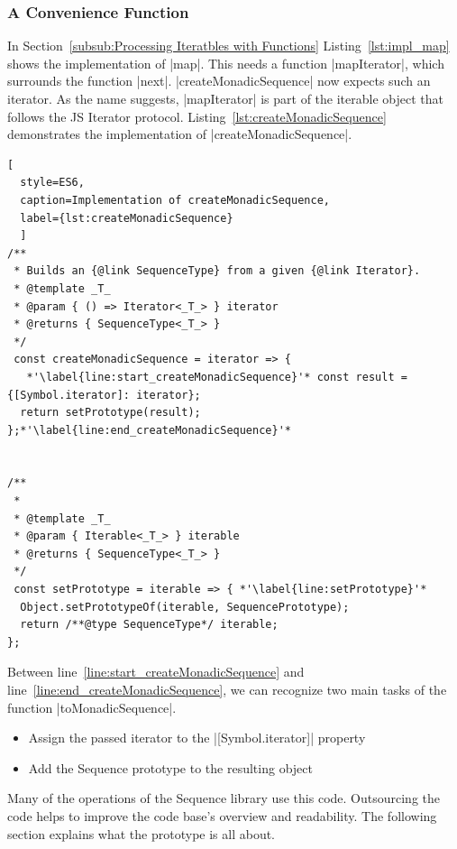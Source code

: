 \subsubsection{A Convenience Function}
\label{subsub:A Convenience Function}
In Section~\ref{subsub:Processing Iteratbles with Functions} Listing~\ref{lst:impl_map} shows the implementation of |map|. This needs a function
|mapIterator|, which surrounds the function |next|. |createMonadicSequence| now 
expects such an iterator. As the name suggests, |mapIterator| is part of the 
iterable object that follows the JS Iterator protocol.
Listing~\ref{lst:createMonadicSequence} demonstrates the implementation of 
|createMonadicSequence|.

\begin{lstlisting}[
  style=ES6, 
  caption=Implementation of createMonadicSequence,
  label={lst:createMonadicSequence}
  ]
/**
 * Builds an {@link SequenceType} from a given {@link Iterator}.
 * @template _T_
 * @param { () => Iterator<_T_> } iterator
 * @returns { SequenceType<_T_> }
 */
 const createMonadicSequence = iterator => {
   *'\label{line:start_createMonadicSequence}'* const result = {[Symbol.iterator]: iterator};
  return setPrototype(result);
};*'\label{line:end_createMonadicSequence}'*


/**
 *
 * @template _T_
 * @param { Iterable<_T_> } iterable
 * @returns { SequenceType<_T_> }
 */
 const setPrototype = iterable => { *'\label{line:setPrototype}'*
  Object.setPrototypeOf(iterable, SequencePrototype);
  return /**@type SequenceType*/ iterable;
};
\end{lstlisting}

Between line~\ref{line:start_createMonadicSequence} and 
line~\ref{line:end_createMonadicSequence}, we can recognize two main tasks of the
function |toMonadicSequence|.

\begin{itemize}
  \item{Assign the passed iterator to the |[Symbol.iterator]| property}
  \item{Add the Sequence prototype to the resulting object}
\end{itemize}

Many of the operations of the Sequence library use this code.
Outsourcing the code helps to improve the code base's overview and readability.
The following section explains what the prototype is all about.

